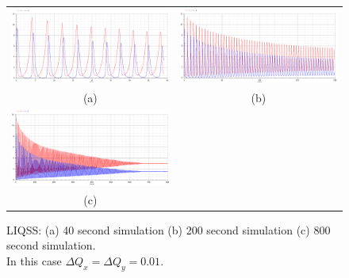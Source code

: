 \documentclass[10pt]{article}
\begin{document}
\begin{figure}[htbp]
\begin{center}
\begin{tabular}{cc}
		\includegraphics[scale=0.18]{Selection_059.png}	&		\includegraphics[scale=0.18]{Selection_058.png}\\
		\footnotesize(a)	&	\footnotesize(b)\\
						\includegraphics[scale=0.18]{Selection_061.png}	\\
		\footnotesize(c)	\\
	\end{tabular}
\end{center}
\vspace{-0.5cm}

\caption{LIQSS: (a) 40 second simulation (b) 200 second simulation  (c) 800 second simulation. \\ In this case $\Delta Q_x =\Delta Q_y =0.01$.}
\end{figure}
\end{document}
